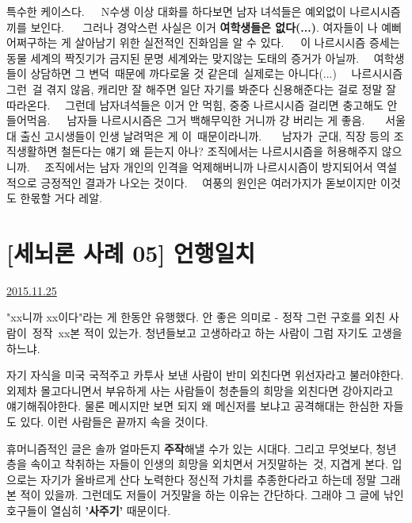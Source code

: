 특수한 케이스다.   N수생 이상 대화를 하다보면 남자 녀석들은 예외없이 나르시시즘 끼를 보인다.    그러나 경악스런 사실은 이거 \textbf{여학생들은 없다(...)}. 여자들이 나 예뻐 어쩌구하는 게 살아남기 위한 실전적인 진화임을 알 수 있다.   이 나르시시즘 증세는 동물 세계의 짝짓기가 금지된 문명 세계와는 맞지않는 도태의 증거가 아닐까.   여학생들이 상담하면 그 변덕 때문에 까다로울 것 같은데 실제로는 아니다(...)   나르시시즘 그런 걸 겪지 않음, 캐리만 잘 해주면 일단 자기를 봐준다 신용해준다는 걸로 정말 잘 따라온다.   그런데 남자녀석들은 이거 안 먹힘, 중중 나르시시즘 걸리면 충고해도 안 들어먹음.   남자들 나르시시즘은 그거 백해무익한 거니까 걍 버리는 게 좋음.    서울대 출신 고시생들이 인생 날려먹은 게 이 때문이라니까.    남자가 군대, 직장 등의 조직생활하면 철든다는 얘기 왜 듣는지 아나? 조직에서는 나르시시즘을 허용해주지 않으니까.   조직에서는 남자 개인의 인격을 억제해버니까 나르시시즘이 방지되어서 역설적으로 긍정적인 결과가 나오는 것이다.   여풍의 원인은 여러가지가 돋보이지만 이것도 한몫할 거다 레알.








\section{[세뇌론 사례 05] 언행일치}
\href{https://www.kockoc.com/Apoc/509842}{2015.11.25}

\vspace{5mm}

"xx니까 xx이다"라는 게 한동안 유행했다. 안 좋은 의미로 -
정작 그런 구호를 외친 사람이 정작 xx본 적이 있는가.
청년들보고 고생하라고 하는 사람이 그럼 자기도 고생을 하느냐.
\vspace{5mm}

자기 자식을 미국 국적주고 카투사 보낸 사람이 반미 외친다면 위선자라고 불러야한다.
외제차 몰고다니면서 부유하게 사는 사람들이 청춘들의 희망을 외친다면 강아지라고 얘기해줘야한다.
물론 메시지만 보면 되지 왜 메신저를 보냐고 공격해대는 한심한 자들도 있다. 이런 사람들은 끝까지 속을 것이다.
\vspace{5mm}

휴머니즘적인 글은 솔까 얼마든지 \textbf{주작}해낼 수가 있는 시대다.
그리고 무엇보다, 청년층을 속이고 착취하는 자들이 인생의 희망을 외치면서 거짓말하는 것, 지겹게 본다.
입으로는 자기가 올바르게 산다 노력한다 정신적 가치를 추종한다라고 하는데 정말 그래본 적이 있을까.
그런데도 저들이 거짓말을 하는 이유는 간단하다. 그래야 그 글에 낚인 호구들이 열심히 \textbf{'사주기'} 때문이다.
\vspace{5mm}

